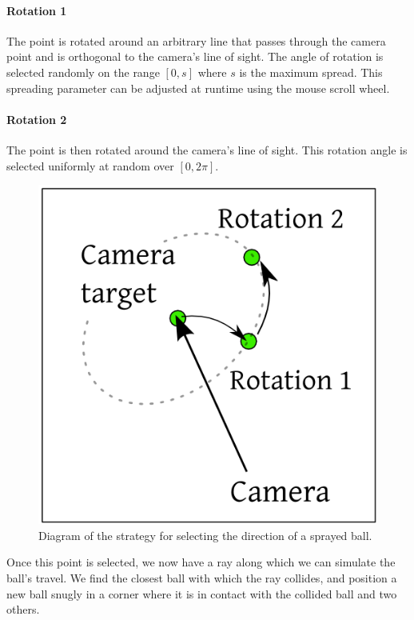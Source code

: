 \documentclass{article}
\begin{document}
\paragraph{Rotation 1}
The point is rotated around an arbitrary line
that passes through the camera point and is
orthogonal to the camera's line of sight.
The angle of rotation is selected randomly on
the range $[0,s]$ where $s$ is the maximum spread.
This spreading parameter can be adjusted at runtime
using the mouse scroll wheel.

\paragraph{Rotation 2}
The point is then rotated around the camera's
line of sight.
This rotation angle is selected uniformly at random
over $[0, 2\pi]$.\\

\begin{figure}[h!]
\centering
\includegraphics[scale=0.3]{cone}
\caption{Diagram of the strategy for selecting
the direction of a sprayed ball.}
\label{fig:cone}
\end{figure}

Once this point is selected, we now have a ray along
which we can simulate the ball's travel.
We find the closest ball with which the ray collides,
and position a new ball snugly in a corner where it
is in contact with the collided ball and two others.
\end{document}
